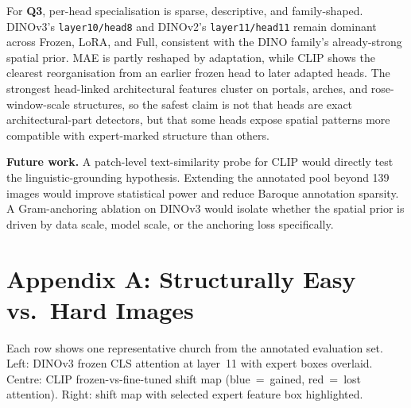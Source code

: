 \documentclass[lineno,pdflatex,sn-mathphys-num]{sn-jnl}%
\theoremstyle{thmstyleone}%
\theoremstyle{thmstyletwo}%
\theoremstyle{thmstylethree}%
\begin{document}
For \textbf{Q3}, per-head specialisation is sparse, descriptive, and
family-shaped. DINOv3's \texttt{layer10/head8} and DINOv2's
\texttt{layer11/head11} remain dominant across Frozen, LoRA, and Full,
consistent with the DINO family's already-strong spatial prior. MAE is partly
reshaped by adaptation, while CLIP shows the clearest reorganisation from an
earlier frozen head to later adapted heads. The strongest head-linked
architectural features cluster on portals, arches, and rose-window-scale
structures, so the safest
claim is not that heads are exact architectural-part detectors, but that some
heads expose spatial patterns more compatible with expert-marked structure
than others.

\textbf{Future work.} A patch-level text-similarity probe for CLIP would
directly test the linguistic-grounding hypothesis. Extending the annotated pool
beyond 139 images would improve statistical power and reduce Baroque annotation
sparsity. A Gram-anchoring ablation on DINOv3 would isolate whether the spatial
prior is driven by data scale, model scale, or the anchoring loss specifically.

\appendix
\section*{Appendix A: Structurally Easy vs.\ Hard Images}

Each row shows one representative church from the annotated evaluation set. Left:
DINOv3 frozen CLS attention at layer~11 with expert boxes overlaid. Centre: CLIP
frozen-vs-fine-tuned shift map (blue~=~gained, red~=~lost attention). Right:
shift map with selected expert feature box highlighted.
\end{document}

